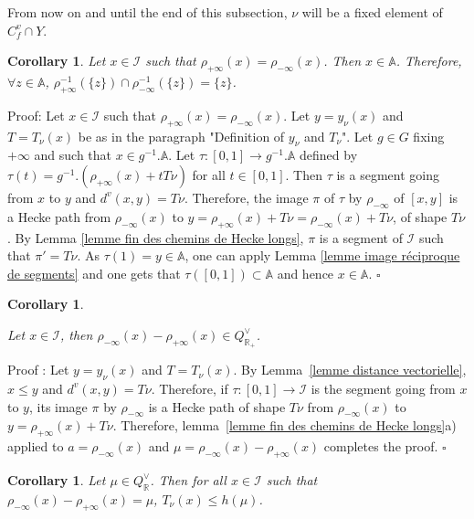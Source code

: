\documentclass[12pt]{article}
\theoremstyle{plain}
\newtheorem{cor}[thm]{Corollary}
\theoremstyle{definition}
\newcommand{\R}{\mathbb{R}}
\newcommand{\A}{\mathbb{A}}
\newcommand{\I}{\mathcal{I}}
\begin{document}
\vspace{3mm}

From now on and until the end of this subsection, $\nu$ will be a fixed element of $C_f^v\cap Y$.

\begin{cor}\label{cor points ayant meme image par les rétractions}
 Let $x\in\mathcal{I}$ such that $\rho_{+\infty}(x)=\rho_{-\infty}(x)$. Then $x\in \mathbb{A}$. Therefore, $\forall z\in \mathbb{A}$, $\rho_{+\infty}^{-1}(\{z\})\cap\rho_{-\infty}^{-1}(\{z\})=\{z\}$.
\end{cor}


Proof:  Let $x\in\mathcal{I}$ such that $\rho_{+\infty}(x)=\rho_{-\infty}(x)$. Let $y=y_\nu(x)$ and $T=T_\nu(x)$ be as in the paragraph "Definition of $y_\nu$ and $T_\nu$". Let $g\in G$ fixing $+\infty$ and such that $x\in g^{-1}.\A$. Let $\tau:[0,1]\rightarrow g^{-1}.\A$ defined by $\tau(t)=g^{-1}.(\rho_{+\infty}(x)+tT\nu)$ for all $t\in [0,1]$. Then $\tau$ is a segment going from $x$ to $y$ and $d^v(x,y)=T\nu$. Therefore, the image $\pi$ of $\tau$ by $\rho_{-\infty}$ of $[x,y]$ is a Hecke path from $\rho_{-\infty}(x)$ to $y=\rho_{+\infty}(x)+T\nu=\rho_{-\infty}(x)+T\nu$, of shape $T\nu$. By Lemma \ref{lemme fin des chemins de Hecke longs}, $\pi$ is a segment of $\mathcal{I}$ such that $\pi'=T\nu$. As $\tau(1)=y\in \A$, one can apply Lemma \ref{lemme image réciproque de segments} and one gets that $\tau([0,1])\subset \mathbb{A}$ and hence $x\in \mathbb{A}$. $\square$


\begin{cor}\label{rque condition sur mu}

 Let $x\in \mathcal{I}$, then $\rho_{-\infty}(x)-\rho_{+\infty}(x)\in Q^\vee_{\R_+}$.
\end{cor}

Proof : Let $y=y_\nu(x)$ and $T=T_\nu(x)$. By Lemma~\ref{lemme distance vectorielle},  $x\leq y$ and $d^v(x,y)=T\nu$. Therefore, if $\tau:[0,1]\rightarrow \I$ is the segment going from $x$ to $y$,  its image $\pi$ by $\rho_{-\infty}$ is a Hecke path of shape $T\nu$ from $\rho_{-\infty}(x)$ to $y=\rho_{+\infty}(x)+T\nu$. Therefore, lemma~\ref{lemme fin des chemins de Hecke longs}a) applied to $a=\rho_{-\infty}(x)$ and $\mu=\rho_{-\infty}(x)-\rho_{+\infty}(x)$ completes the proof. $\square$


\begin{cor}\label{corollaire majoration de T}
Let $\mu\in Q^\vee_\R$. Then for all $x\in \I$ such that $\rho_{-\infty}(x)-\rho_{+\infty}(x)=\mu$, $T_\nu(x)\leq h(\mu)$.
\end{cor}
\end{document}
